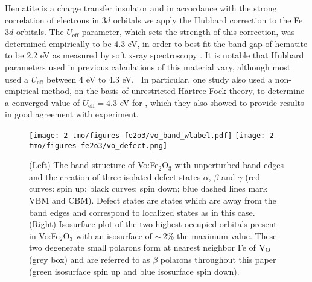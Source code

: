 Hematite is a charge transfer insulator \cite{drager1992high,catti1995theoretical} and in accordance with the strong correlation of electrons in $3d$ orbitals we apply the Hubbard correction \cite{dudarev1998electron} to the Fe $3d$ orbitals. The $U_{\text{eff}}$ parameter, which sets the strength of this correction, was determined empirically to be 4.3 eV, in order to best fit the band gap of hematite to be 2.2 eV as measured by soft x-ray spectroscopy \cite{gilbert2009band}. It is notable that Hubbard parameters used in previous calculations of this material vary, although most used a $U_{\text{eff}}$ between 4 eV to 4.3 eV.~\cite{lee2013thermodynamics,adelstein2014density,cava2013effects,zhou2015understanding,mosey2008rotationally,rollmann2004first,liao2011electron} In particular, one study also used a non-empirical method, on the basis of unrestricted Hartree Fock theory, to determine a converged value of $U_{\text{eff}} = 4.3$ eV for , which they also showed to provide results in good agreement with experiment.~\cite{mosey2008rotationally}


\begin{figure}
\begin{center}
\texttt{[image: 2-tmo/figures-fe2o3/vo\_band\_wlabel.pdf]} %
\vspace{2mm}
\texttt{[image: 2-tmo/figures-fe2o3/vo\_defect.png]}
\caption{(Left) The band structure of Vo:Fe$_2$O$_3$ with unperturbed band edges and the creation of three isolated defect states $\alpha$, $\beta$ and $\gamma$ (red curves: spin up; black curves: spin down; blue dashed lines mark VBM and CBM). Defect states are states which are away from the band edges and correspond to localized states as in this case. (Right) Isosurface plot of the two highest occupied orbitals present in Vo:Fe$_2$O$_3$ with an isosurface of $\sim\,$2\% the maximum value. These two degenerate small polarons form at nearest neighbor Fe of $\text{V}_\text{O}$ (grey box) and are referred to as $\beta$ polarons throughout this paper (green isosurface spin up and blue isosurface spin down).} \label{fe2o3:fig:vo}
\end{center}
\end{figure}



